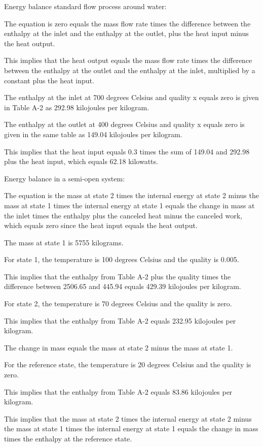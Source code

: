Energy balance standard flow process around water:

The equation is zero equals the mass flow rate times the difference between the enthalpy at the inlet and the enthalpy at the outlet, plus the heat input minus the heat output.

This implies that the heat output equals the mass flow rate times the difference between the enthalpy at the outlet and the enthalpy at the inlet, multiplied by a constant plus the heat input.

The enthalpy at the inlet at 700 degrees Celsius and quality x equals zero is given in Table A-2 as 292.98 kilojoules per kilogram.

The enthalpy at the outlet at 400 degrees Celsius and quality x equals zero is given in the same table as 149.04 kilojoules per kilogram.

This implies that the heat input equals 0.3 times the sum of 149.04 and 292.98 plus the heat input, which equals 62.18 kilowatts.

Energy balance in a semi-open system:

The equation is the mass at state 2 times the internal energy at state 2 minus the mass at state 1 times the internal energy at state 1 equals the change in mass at the inlet times the enthalpy plus the canceled heat minus the canceled work, which equals zero since the heat input equals the heat output.

The mass at state 1 is 5755 kilograms.

For state 1, the temperature is 100 degrees Celsius and the quality is 0.005.

This implies that the enthalpy from Table A-2 plus the quality times the difference between 2506.65 and 445.94 equals 429.39 kilojoules per kilogram.

For state 2, the temperature is 70 degrees Celsius and the quality is zero.

This implies that the enthalpy from Table A-2 equals 232.95 kilojoules per kilogram.

The change in mass equals the mass at state 2 minus the mass at state 1.

For the reference state, the temperature is 20 degrees Celsius and the quality is zero.

This implies that the enthalpy from Table A-2 equals 83.86 kilojoules per kilogram.

This implies that the mass at state 2 times the internal energy at state 2 minus the mass at state 1 times the internal energy at state 1 equals the change in mass times the enthalpy at the reference state.

